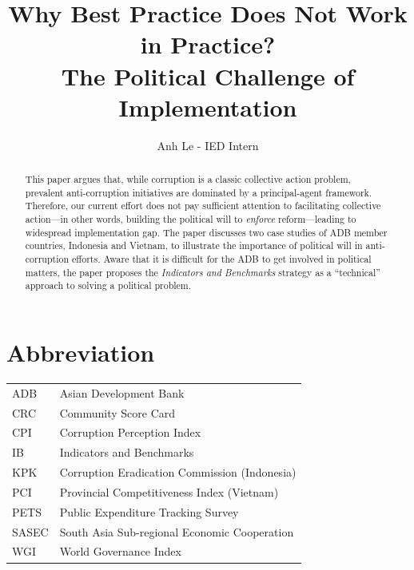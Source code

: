\documentclass[12pt]{article}
\title{Why Best Practice Does Not Work in Practice?\\
        The Political Challenge of Implementation}
\author{Anh Le - IED Intern}
\date{}
\begin{document}
\maketitle

\begin{abstract}
This paper argues that, while corruption is a classic collective action problem, prevalent anti-corruption initiatives are dominated by a principal-agent framework. Therefore, our current effort does not pay sufficient attention to facilitating collective action---in other words, building the political will to \textit{enforce} reform---leading to widespread implementation gap. The paper discusses two case studies of ADB member countries, Indonesia and Vietnam, to illustrate the importance of political will in anti-corruption efforts. Aware that it is difficult for the ADB to get involved in political matters, the paper proposes the \textit{Indicators and Benchmarks} strategy as a ``technical'' approach to solving a political problem.
\end{abstract}

\newpage
\thispagestyle{plain}

\begin{spacing}{0.1}
\tableofcontents
\end{spacing}

\begin{spacing}{0.1}
\listoffigures
\end{spacing}

\section*{Abbreviation}
\begin{tabular}{ll}
ADB & Asian Development Bank \\
CRC & Community Score Card \\
CPI & Corruption Perception Index \\
IB & Indicators and Benchmarks \\
KPK & Corruption Eradication Commission (Indonesia) \\
PCI & Provincial Competitiveness Index (Vietnam)  \\
PETS & Public Expenditure Tracking Survey \\
SASEC & South Asia Sub-regional Economic Cooperation \\
WGI & World Governance Index \\
\end{tabular}

\newpage
\end{document}
